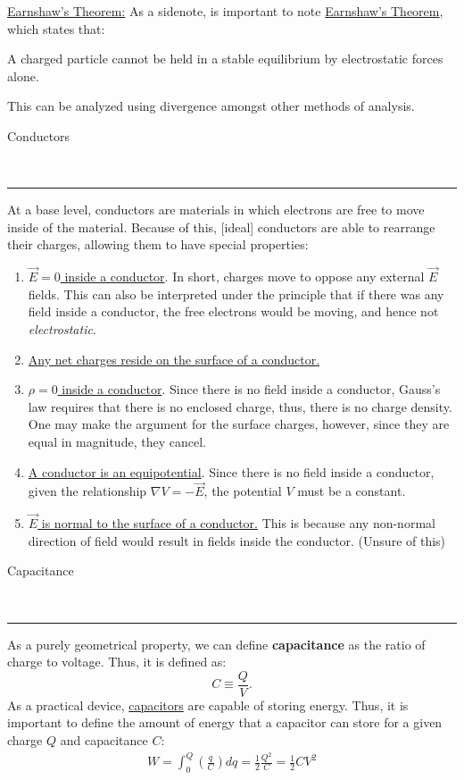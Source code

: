 \documentclass{article}
\newcommand{\header}[1]{\begin{large}\noindent #1\end{large}\\\rule{\textwidth}{0.5pt}}
\newcommand{\gap}{\medskip\\}
\newcommand{\centertext}[1]{\begin{center}#1\end{center}}
\newcommand{\bfrac}[2]{\left(\frac{#1}{#2}\right)}
\newcommand{\sheader}[1]{\underline{#1:}}
\begin{document}
\sheader{Earnshaw's Theorem} As a sidenote, is important to note \underline{Earnshaw's Theorem},
which states that: 
\centertext{A charged particle cannot be held in a stable equilibrium by electrostatic forces alone.}
This can be analyzed using divergence amongst other methods of analysis.
\gap
\header{Conductors}
At a base level, conductors are materials in which electrons are free to move inside 
of the material. Because of this, [ideal] conductors are able to rearrange their
charges, allowing them to have special properties:
\begin{enumerate}
    \item \underline{$\vec{E} = 0$ inside a conductor}. In short, charges move to oppose any external $\vec{E}$ fields.
    This can also be interpreted under the principle that if there was any field inside
    a conductor, the free electrons would be moving, and hence not \textit{electrostatic}.
    \item \underline{Any net charges reside on the surface of a conductor.}
    \item \underline{$\rho = 0$ inside a conductor}. Since there is no field inside a conductor,
    Gauss's law requires that there is no enclosed charge, thus, there is no charge density.
    One may make the argument for the surface charges, however, since they are equal in magnitude,
    they cancel.
    \item \underline{A conductor is an equipotential}. Since there is no field inside
    a conductor, given the relationship $\nabla V = -\vec{E}$, the potential $V$ must
    be a constant.
    \item \underline{$\vec{E}$ is normal to the surface of a conductor.} This is because
    any non-normal direction of field would result in fields inside the conductor. (Unsure of this)
\end{enumerate} 

\header{Capacitance}

As a purely geometrical property, we can define \textbf{capacitance} as the ratio of
charge to voltage. Thus, it is defined as:
\[
    C \equiv \frac{Q}{V}.    
\]
As a practical device, \underline{capacitors} are capable of storing energy. Thus, it
is important to define the amount of energy that a capacitor can store for a given 
charge $Q$ and capacitance $C$:
\begin{align*}
    W = \int_0^Q{\bfrac{q}{C}dq} = \frac{1}{2}\frac{Q^2}{C} = \frac{1}{2} CV^2
\end{align*}
\end{document}
